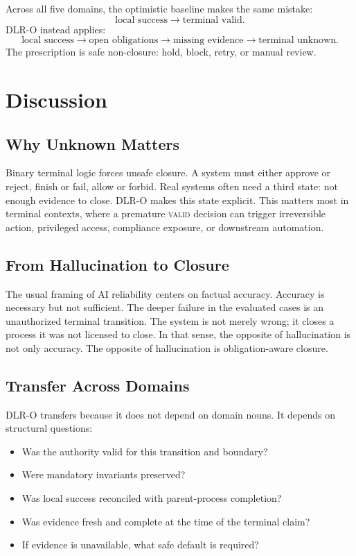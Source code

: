 \documentclass[11pt]{article}
\newcommand{\valid}{\textsc{valid}}
\begin{document}
Across all five domains, the optimistic baseline makes the same mistake:
\[
\text{local success} \rightarrow \text{terminal valid}.
\]
DLR-O instead applies:
\[
\text{local success} \rightarrow \text{open obligations}
\rightarrow \text{missing evidence} \rightarrow \text{terminal unknown}.
\]
The prescription is safe non-closure: hold, block, retry, or manual review.

\section{Discussion}

\subsection{Why Unknown Matters}

Binary terminal logic forces unsafe closure. A system must either approve or
reject, finish or fail, allow or forbid. Real systems often need a third state:
not enough evidence to close. DLR-O makes this state explicit. This matters
most in terminal contexts, where a premature \valid{} decision can trigger
irreversible action, privileged access, compliance exposure, or downstream
automation.

\subsection{From Hallucination to Closure}

The usual framing of AI reliability centers on factual accuracy. Accuracy is
necessary but not sufficient. The deeper failure in the evaluated cases is an
unauthorized terminal transition. The system is not merely wrong; it closes a
process it was not licensed to close. In that sense, the opposite of
hallucination is not only accuracy. The opposite of hallucination is
obligation-aware closure.

\subsection{Transfer Across Domains}

DLR-O transfers because it does not depend on domain nouns. It depends on
structural questions:

\begin{itemize}
\item Was the authority valid for this transition and boundary?
\item Were mandatory invariants preserved?
\item Was local success reconciled with parent-process completion?
\item Was evidence fresh and complete at the time of the terminal claim?
\item If evidence is unavailable, what safe default is required?
\end{itemize}
\end{document}

